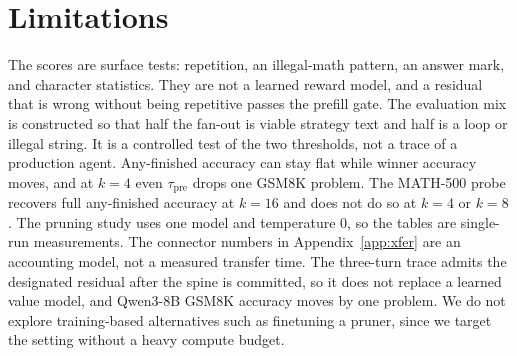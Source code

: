 \section{Limitations}
\label{sec:limit}

The scores are surface tests: repetition, an illegal-math pattern, an answer mark, and character statistics.
They are not a learned reward model, and a residual that is wrong without being repetitive passes the prefill gate.
The evaluation mix is constructed so that half the fan-out is viable strategy text and half is a loop or illegal string.
It is a controlled test of the two thresholds, not a trace of a production agent.
Any-finished accuracy can stay flat while winner accuracy moves, and at $k{=}4$ even $\tau_{\mathrm{pre}}$ drops one GSM8K problem.
The MATH-500 probe recovers full any-finished accuracy at $k{=}16$ and does not do so at $k{=}4$ or $k{=}8$.
The pruning study uses one model and temperature $0$, so the tables are single-run measurements.
The connector numbers in Appendix~\ref{app:xfer} are an accounting model, not a measured transfer time.
The three-turn trace admits the designated residual after the spine is committed, so it does not replace a learned value model, and Qwen3-8B GSM8K accuracy moves by one problem.
We do not explore training-based alternatives such as finetuning a pruner, since we target the setting without a heavy compute budget.
